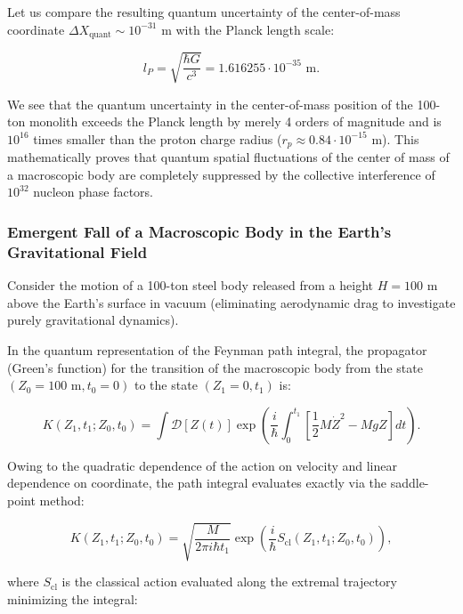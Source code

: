 \documentclass[11pt,a4paper]{article}
\theoremstyle{definition}
\begin{document}
Let us compare the resulting quantum uncertainty of the center-of-mass coordinate $\Delta X_{\text{quant}} \sim 10^{-31}\text{ m}$ with the Planck length scale:

\begin{equation}\label{eq:5.20}\tag{5.20}
l_P = \sqrt{\frac{\hbar G}{c^3}} = 1.616255 \cdot 10^{-35}\text{ m}.
\end{equation}

We see that the quantum uncertainty in the center-of-mass position of the 100-ton monolith exceeds the Planck length by merely 4 orders of magnitude and is $10^{16}$ times smaller than the proton charge radius ($r_p \approx 0.84 \cdot 10^{-15}\text{ m}$). This mathematically proves that quantum spatial fluctuations of the center of mass of a macroscopic body are completely suppressed by the collective interference of $10^{32}$ nucleon phase factors.

\subsubsection{Emergent Fall of a Macroscopic Body in the Earth's Gravitational Field}\label{sec:5.1.5}

Consider the motion of a 100-ton steel body released from a height $H = 100\text{ m}$ above the Earth's surface in vacuum (eliminating aerodynamic drag to investigate purely gravitational dynamics).

In the quantum representation of the Feynman path integral, the propagator (Green's function) for the transition of the macroscopic body from the state $(Z_0 = 100\text{ m}, t_0 = 0)$ to the state $(Z_1 = 0, t_1)$ is:

\begin{equation}\label{eq:5.21}\tag{5.21}
K(Z_1, t_1; Z_0, t_0) = \int \mathcal{D}[Z(t)] \exp\left( \frac{i}{\hbar} \int_0^{t_1} \left[ \frac{1}{2} M \dot{Z}^2 - M g Z \right] dt \right).
\end{equation}

Owing to the quadratic dependence of the action on velocity and linear dependence on coordinate, the path integral evaluates exactly via the saddle-point method:

\begin{equation}\label{eq:5.22}\tag{5.22}
K(Z_1, t_1; Z_0, t_0) = \sqrt{\frac{M}{2\pi i \hbar t_1}} \exp\left( \frac{i}{\hbar} S_{\text{cl}}(Z_1, t_1; Z_0, t_0) \right),
\end{equation}

where $S_{\text{cl}}$ is the classical action evaluated along the extremal trajectory minimizing the integral:
\end{document}
